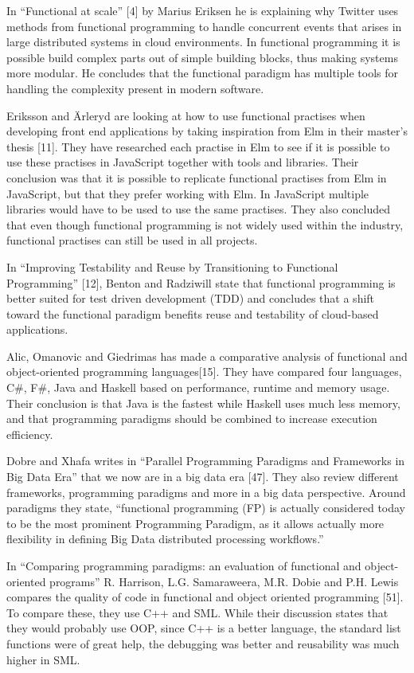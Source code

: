 \documentclass {article}
\begin{document}
In “Functional at scale” [4] by Marius Eriksen he is explaining why Twitter uses methods from functional programming to handle concurrent events that arises in large distributed systems in cloud environments. In functional programming it is possible build complex parts out of simple building blocks, thus making systems more modular. He concludes that the functional paradigm has multiple tools for handling the complexity present in modern software.

Eriksson and Ärleryd are looking at how to use functional practises when developing front end applications by taking inspiration from Elm in their master's thesis [11]. They have researched each practise in Elm to see if it is possible to use these practises in JavaScript together with tools and libraries. Their conclusion was that it is possible to replicate functional practises from Elm in JavaScript, but that they prefer working with Elm. In JavaScript multiple libraries would have to be used to use the same practises. They also concluded that even though functional programming is not widely used within the industry, functional practises can still be used in all projects.

In “Improving Testability and Reuse by Transitioning to Functional Programming” [12], Benton and Radziwill state that functional programming is better suited for test driven development (TDD) and concludes that a shift toward the functional paradigm benefits reuse and testability of cloud-based applications.

Alic, Omanovic and Giedrimas has made a comparative analysis of functional and object-oriented programming languages[15]. They have compared four languages, C\#, F\#, Java and Haskell based on performance, runtime and memory usage. Their conclusion is that Java is the fastest while Haskell uses much less memory, and that programming paradigms should be combined to increase execution efficiency. 

Dobre and Xhafa writes in “Parallel Programming Paradigms and Frameworks in Big Data Era” that we now are in a big data era [47]. They also review different frameworks, programming paradigms and more in a big data perspective. Around paradigms they state, “functional programming (FP) is actually considered today to be the most prominent Programming Paradigm, as it allows actually more flexibility in defining Big Data distributed processing workflows.”

In “Comparing programming paradigms: an evaluation of functional and object-oriented programs” R. Harrison, L.G. Samaraweera, M.R. Dobie and P.H. Lewis  compares the quality of code in functional and object oriented programming [51]. To compare these, they use C++ and SML. While their discussion states that they would probably use OOP, since C++ is a better language, the standard list functions were of great help, the debugging was better and reusability was much higher in SML.
\end{document}
